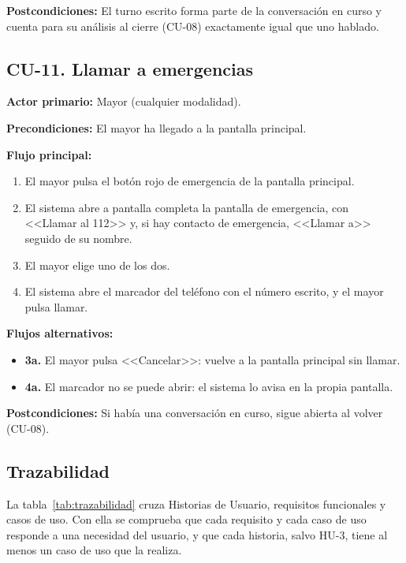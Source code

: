 \noindent\textbf{Postcondiciones:} El turno escrito forma parte de la conversación en curso y cuenta para su análisis al cierre (CU-08) exactamente igual que uno hablado.

\bigskip

\subsection*{CU-11. Llamar a emergencias}

\noindent\textbf{Actor primario:} Mayor (cualquier modalidad).

\noindent\textbf{Precondiciones:} El mayor ha llegado a la pantalla principal.

\noindent\textbf{Flujo principal:}
\begin{enumerate}[nosep]
    \item El mayor pulsa el botón rojo de emergencia de la pantalla principal.
    \item El sistema abre a pantalla completa la pantalla de emergencia, con <<Llamar al 112>> y, si hay contacto de emergencia, <<Llamar a>> seguido de su nombre.
    \item El mayor elige uno de los dos.
    \item El sistema abre el marcador del teléfono con el número escrito, y el mayor pulsa llamar.
\end{enumerate}

\noindent\textbf{Flujos alternativos:}
\begin{itemize}[nosep]
    \item \textbf{3a.} El mayor pulsa <<Cancelar>>: vuelve a la pantalla principal sin llamar.
    \item \textbf{4a.} El marcador no se puede abrir: el sistema lo avisa en la propia pantalla.
\end{itemize}

\noindent\textbf{Postcondiciones:} Si había una conversación en curso, sigue abierta al volver (CU-08).


\subsection{Trazabilidad}

La tabla~\ref{tab:trazabilidad} cruza Historias de Usuario, requisitos funcionales y casos de uso. Con ella se comprueba que cada requisito y cada caso de uso responde a una necesidad del usuario, y que cada historia, salvo HU-3, tiene al menos un caso de uso que la realiza.

